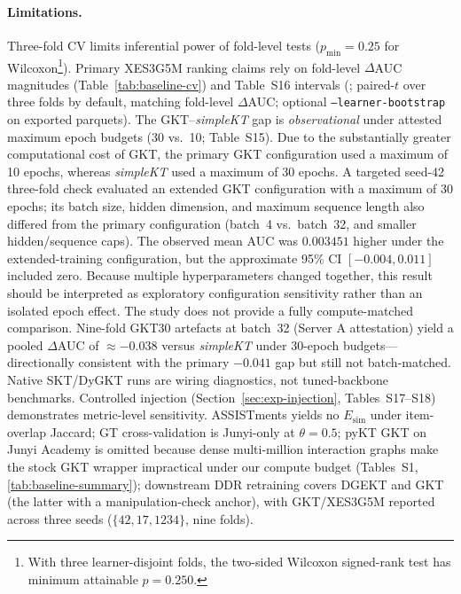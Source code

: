 \documentclass[pdflatex,sn-mathphys-num]{sn-jnl}
\newcommand{\Esim}{\ensuremath{E_{\text{sim}}}}
\newcommand{\DDR}{\textsc{DDR}}
\begin{document}
\paragraph{Limitations.}\label{sec:limitations}
Three-fold CV limits inferential power of fold-level tests ($p_{\min}{=}0.25$ for
Wilcoxon\footnote{With three learner-disjoint folds, the two-sided Wilcoxon signed-rank test has minimum attainable $p{=}0.250$.}).
Primary XES3G5M ranking claims rely on fold-level $\Delta$AUC
magnitudes (Table~\ref{tab:baseline-cv}) and Table~S16 intervals
(; paired-$t$ over three folds by default,
matching fold-level $\Delta$AUC; optional \texttt{--learner-bootstrap} on
exported parquets). The GKT--\textit{simpleKT}
gap is \emph{observational} under attested maximum epoch budgets (30 vs.\ 10; Table~S15).
Due to the substantially greater computational cost of GKT, the
primary GKT configuration used a maximum of 10 epochs, whereas
\textit{simpleKT} used a maximum of 30 epochs. A targeted seed-42
three-fold check evaluated an extended GKT configuration with a
maximum of 30 epochs; its batch size, hidden dimension, and maximum sequence
length also differed from the primary configuration (batch~4 vs.\ batch~32,
and smaller hidden/sequence caps). The observed mean AUC was
$0.003451$ higher under the extended-training configuration, but the
approximate 95\% CI $[-0.004,0.011]$ included zero. Because multiple
hyperparameters changed together, this result should be interpreted as exploratory
configuration sensitivity rather than an isolated epoch effect. The
study does not provide a fully compute-matched comparison. Nine-fold GKT30
artefacts at batch~32 (Server A attestation) yield a pooled $\Delta$AUC of
${\approx}{-}0.038$ versus \textit{simpleKT} under 30-epoch budgets---directionally
consistent with the primary $-0.041$ gap but still not batch-matched.
Native SKT/DyGKT runs
are wiring diagnostics, not tuned-backbone benchmarks. Controlled injection
(Section~\ref{sec:exp-injection}, Tables~S17--S18) demonstrates metric-level
sensitivity. ASSISTments yields no $\Esim$ under item-overlap Jaccard; GT
cross-validation is Junyi-only at $\theta{=}0.5$; pyKT GKT on Junyi Academy
is omitted because dense multi-million interaction graphs make the stock GKT
wrapper impractical under our compute budget (Tables~S1, \ref{tab:baseline-summary});
downstream \DDR{} retraining covers DGEKT and GKT (the latter with a
manipulation-check anchor), with GKT/XES3G5M reported across three seeds
($\{42,17,1234\}$, nine folds).
\end{document}
